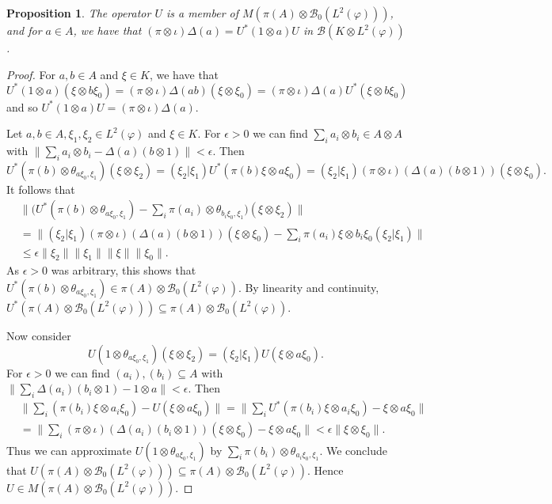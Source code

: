 \documentclass[twoside,a4paper,12pt]{article}
\theoremstyle{plain}
\newtheorem{proposition}{Proposition}[section]
\theoremstyle{definition}
\newcommand{\mc}{\mathcal}
\begin{document}
\begin{proposition}\label{prop:corepgivescomult}
The operator $U$ is a member of $M(\pi(A)\otimes\mc B_0(L^2(\varphi)))$,
and for $a\in A$, we have that $(\pi\otimes\iota)\Delta(a) =
U^*(1\otimes a)U$ in $\mc B(K\otimes L^2(\varphi))$.
\end{proposition}
\begin{proof}
For $a,b\in A$ and $\xi\in K$, we have that
$U^*(1\otimes a)(\xi\otimes b\xi_0)
= (\pi\otimes\iota)\Delta(ab)(\xi\otimes\xi_0)
= (\pi\otimes\iota)\Delta(a) U^*(\xi\otimes b\xi_0)$ and so
$U^*(1\otimes a)U = (\pi\otimes\iota)\Delta(a)$.

Let $a,b\in A, \xi_1,\xi_2\in L^2(\varphi)$ and $\xi\in K$.  For $\epsilon>0$ we
can find $\sum_i a_i\otimes b_i\in A\otimes A$ with $\|\sum_i a_i\otimes b_i
- \Delta(a)(b\otimes 1)\|<\epsilon$.  Then
\[ U^*(\pi(b)\otimes\theta_{a\xi_0,\xi_1})(\xi\otimes \xi_2)
= (\xi_2|\xi_1) U^*(\pi(b)\xi\otimes a\xi_0)
= (\xi_2|\xi_1) (\pi\otimes\iota)(\Delta(a)(b\otimes 1))(\xi\otimes\xi_0). \]
It follows that
\begin{align*} & \Big\| \Big( U^*(\pi(b)\otimes\theta_{a\xi_0,\xi_1})
   - \sum_i \pi(a_i) \otimes \theta_{b_i\xi_0,\xi_1}\Big)
   (\xi \otimes \xi_2) \Big\| \\
&= \Big\| (\xi_2|\xi_1) (\pi\otimes\iota)(\Delta(a)(b\otimes 1))
   (\xi\otimes\xi_0)
   - \sum_i \pi(a_i)\xi \otimes b_i\xi_0 (\xi_2|\xi_1) \Big\| \\
&\leq \epsilon \|\xi_2\| \|\xi_1\| \|\xi\| \|\xi_0\|.
\end{align*}
As $\epsilon>0$ was arbitrary, this shows that $U^*(\pi(b)\otimes 
\theta_{a\xi_0,\xi_1}) \in \pi(A)\otimes\mc B_0(L^2(\varphi))$.  By linearity and
continuity, $U^*(\pi(A)\otimes\mc B_0(L^2(\varphi))) \subseteq
\pi(A)\otimes\mc B_0(L^2(\varphi))$.

Now consider
\[ U(1\otimes\theta_{a\xi_0,\xi_1}) (\xi\otimes\xi_2)
= (\xi_2|\xi_1) U(\xi\otimes a\xi_0). \]
For $\epsilon>0$ we can find $(a_i),(b_i)\subseteq A$ with
$\| \sum_i \Delta(a_i)(b_i\otimes 1) - 1\otimes a\|<\epsilon$.  Then
\begin{align*} &
\Big\| \sum_i (\pi(b_i)\xi\otimes a_i\xi_0) - U(\xi\otimes a\xi_0) \Big\|
= \Big\| \sum_i U^*(\pi(b_i)\xi\otimes a_i\xi_0) - \xi\otimes a\xi_0 \Big\|\\
&= \Big\| \sum_i (\pi\otimes\iota)(\Delta(a_i)(b_i\otimes 1))(\xi\otimes\xi_0)
- \xi\otimes a\xi_0 \Big\|
< \epsilon \| \xi\otimes\xi_0 \|.
\end{align*}
Thus we can approximate $U(1\otimes\theta_{a\xi_0,\xi_1})$ by
$\sum_i \pi(b_i) \otimes \theta_{a_i\xi_0,\xi_1}$.  We conclude that
$U(\pi(A)\otimes\mc B_0(L^2(\varphi))) \subseteq
\pi(A)\otimes\mc B_0(L^2(\varphi))$.
Hence $U\in M(\pi(A)\otimes\mc B_0(L^2(\varphi)))$.
\end{proof}
\end{document}
